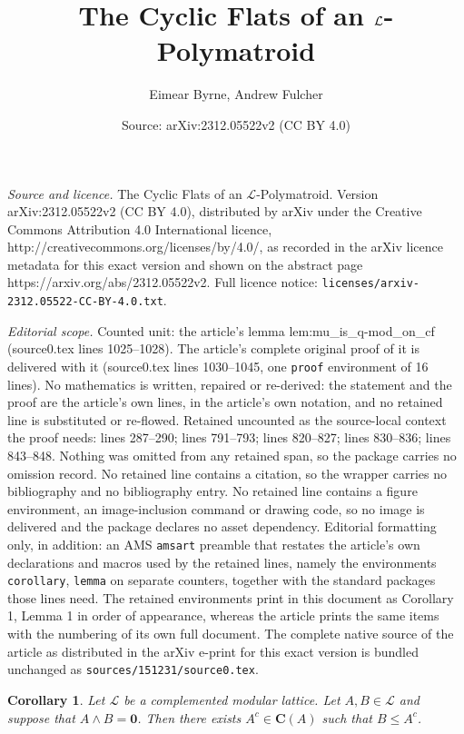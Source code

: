 \documentclass[10pt,a4paper]{amsart}
\title{The Cyclic Flats of an $\mL$-Polymatroid}
\author{Eimear Byrne, Andrew Fulcher}
\date{Source: arXiv:2312.05522v2 (CC BY 4.0)}
\newtheorem{corollary}{Corollary}
\newcommand{\mL}{\mathcal{L}}
\newcommand{\zero}{{\mathbf{0}}}
\begin{document}
\maketitle

\noindent\emph{Source and licence.} The Cyclic Flats of an $\mL$-Polymatroid. Version arXiv:2312.05522v2 (CC BY 4.0), distributed by arXiv under the Creative Commons Attribution 4.0 International licence, http://creativecommons.org/licenses/by/4.0/, as recorded in the arXiv licence metadata for this exact version and shown on the abstract page https://arxiv.org/abs/2312.05522v2. Full licence notice: \texttt{licenses/arxiv-2312.05522-CC-BY-4.0.txt}.\par\smallskip

\noindent\textit{Editorial scope.} Counted unit: the article's lemma lem:mu\_is\_q-mod\_on\_cf (source0.tex lines 1025--1028). The article's complete original proof of it is delivered with it (source0.tex lines 1030--1045, one \texttt{proof} environment of 16 lines). No mathematics is written, repaired or re-derived: the statement and the proof are the article's own lines, in the article's own notation, and no retained line is substituted or re-flowed.  Retained uncounted as the source-local context the proof needs: lines 287--290; lines 791--793; lines 820--827; lines 830--836; lines 843--848.  Nothing was omitted from any retained span, so the package carries no omission record.  No retained line contains a citation, so the wrapper carries no bibliography and no bibliography entry.  No retained line contains a figure environment, an image-inclusion command or drawing code, so no image is delivered and the package declares no asset dependency.  Editorial formatting only, in addition: an AMS \texttt{amsart} preamble that restates the article's own declarations and macros used by the retained lines, namely the environments \texttt{corollary}, \texttt{lemma} on separate counters, together with the standard packages those lines need.  The retained environments print in this document as Corollary 1, Lemma 1 in order of appearance, whereas the article prints the same items with the numbering of its own full document.  The complete native source of the article as distributed in the arXiv e-print for this exact version is bundled unchanged as \texttt{sources/151231/source0.tex}.
\begin{corollary}\label{cor:extend_to_complement}
    Let $\mL$ be a complemented modular lattice.
    Let $A,B\in\mathcal{L}$ and suppose that $A\wedge B=\zero$. Then there exists $A^c\in\mathbf{C}(A)$ such that $B\leq A^c$.
\end{corollary}
\end{document}
